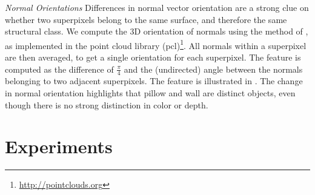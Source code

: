 \emph{Normal Orientations}
    Differences in normal vector orientation are a strong clue on
    whether two superpixels belong to the same surface, and therefore the
    same structural class.
    We compute the 3D orientation of normals using the method of \citet{holz_2011_robocup},
    as implemented in the point cloud library (pcl)\footnote{\url{http://pointclouds.org}}.
    All normals within a superpixel are then averaged, to get a single orientation for each superpixel.
    The feature is computed as the difference of $\frac{\pi}{4}$ and the (undirected) angle between the normals belonging
    to two adjacent superpixels.  
    The feature is illustrated in . The change
    in normal orientation highlights that pillow and wall are distinct
    objects, even though there is no strong distinction in color or depth.


\section{Experiments}

